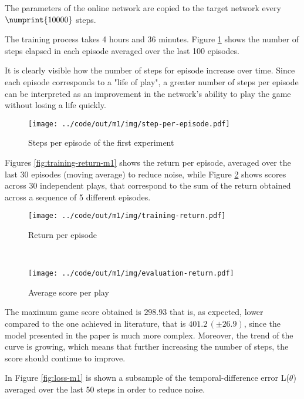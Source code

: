 \documentclass[a4paper,12pt]{article} %
\begin{document}
	The parameters of the online network are copied to the target network every $\numprint{10000}$ steps.
	\bigskip
	
	The training process takes 4 hours and 36 minutes. Figure \ref{fig:step-m1} shows the number of steps elapsed in each episode averaged over the last 100 episodes. 
	
	It is clearly visible how the number of steps for episode increase over time. Since each episode corresponds to a "life of play", a greater number of steps per episode can be interpreted as an improvement in the network's ability to play the game without losing a life quickly. 
	\begin{figure}[htb]
		\centering
		\texttt{[image: ../code/out/m1/img/step-per-episode.pdf]}	
		\caption{Steps per episode of the first experiment}
		\label{fig:step-m1}
	\end{figure}
	
	Figures \ref{fig:training-return-m1} shows the return per episode, averaged over the last 30 episodes (moving average) to reduce noise, while Figure \ref{fig:evaluation-return-m1} shows scores across 30 independent plays, that correspond to the sum of the return obtained across a sequence of 5 different episodes.
	
	\begin{figure}[H]
		\begin{minipage}[b]{.49\textwidth}
			\centering
			\texttt{[image: ../code/out/m1/img/training-return.pdf]}	
			\caption{Return per episode}
			\label{fig:training-return-m1}
		\end{minipage}
		~
		\begin{minipage}[b]{.49\textwidth}
			\centering
			\texttt{[image: ../code/out/m1/img/evaluation-return.pdf]}	
			\caption{Average score per play}
			\label{fig:evaluation-return-m1}
		\end{minipage}
	\end{figure}

	The maximum game score obtained is $298.93$ that is, as expected, lower compared to the one achieved in literature, that is $401.2 \, (\pm 26.9)$, since the model presented in the paper is much more complex.
	Moreover, the trend of the curve is growing, which means that further increasing the number of steps, the score should continue to improve.
	\bigskip
		
	In Figure \ref{fig:loss-m1} is shown a subsample of the temporal-difference error L($\theta$) averaged over the last 50 steps in order to reduce noise.
	
\end{document}
